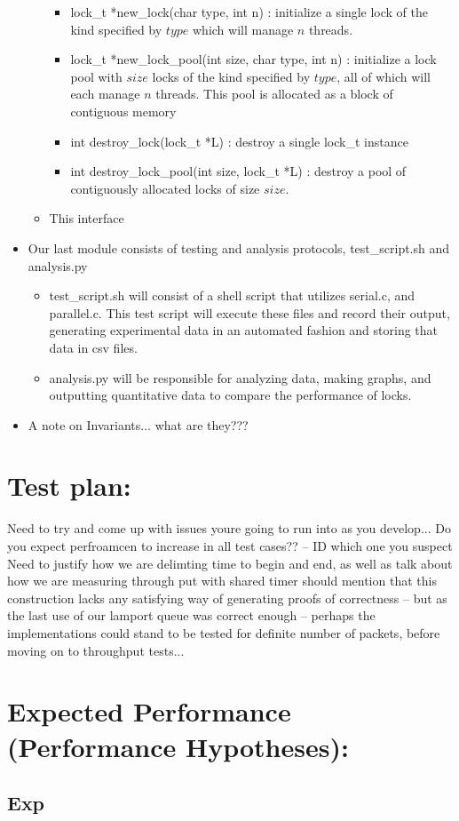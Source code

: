 \documentclass[]{article}
\begin{document}
\begin{itemize}
\begin{itemize}
		\begin{itemize}
			\item lock\_t *new\_lock(char type, int n) : initialize a single lock of the kind specified by $type$ which will manage $n$ threads.
			\item lock\_t *new\_lock\_pool(int size, char type, int n) : initialize a lock pool with $size$ locks of the kind specified by $type$, all of which will each manage $n$ threads. This pool is allocated as a block of contiguous memory
			\item int destroy\_lock(lock\_t *L) : destroy a single lock\_t instance
			\item int destroy\_lock\_pool(int size, lock\_t *L) : destroy a pool of contiguously allocated locks of size $size$.
		\end{itemize}
		\item This interface
	\end{itemize}
	\item Our last module consists of testing and analysis protocols, test\_script.sh and analysis.py
	\begin{itemize}
		\item test\_script.sh will consist of a shell script that utilizes serial.c, and parallel.c. This test script will execute these files and record their output, generating experimental data in an automated fashion and storing that data in csv files.

	
		\item analysis.py will be responsible for analyzing data, making graphs, and outputting quantitative data to compare the performance of locks.
	\end{itemize}

	\item A note on Invariants... what are they???
\end{itemize}

\section{Test plan:} 
Need to try and come up with issues youre going to run into as you develop...
Do you expect perfroamcen to increase in all test cases?? -- ID which one you suspect
Need to justify how we are delimting time to begin and end, as well as talk about how we are measuring through put with shared timer
should mention that this construction lacks any satisfying way of generating proofs of correctness -- but as the last use of our lamport queue was correct enough -- perhaps the implementations could stand to be tested for definite number of packets, before moving on to throughput tests...

\section{Expected Performance (Performance Hypotheses):}
	
\subsection{Exp}
		
\end{document}
